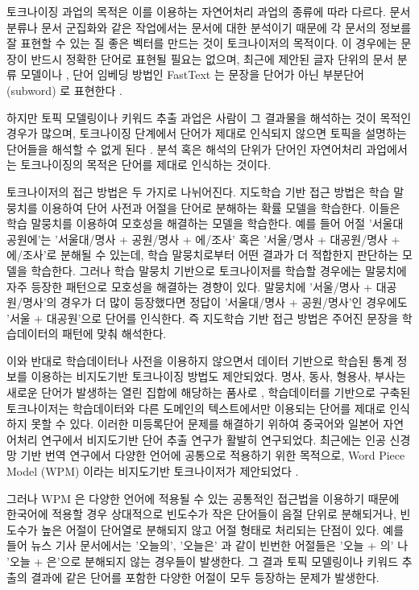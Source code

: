 \documentclass[oneside, ko,phd]{snuthesis_utf8_kor}
\begin{document}
토크나이징 과업의 목적은 이를 이용하는 자연어처리 과업의 종류에 따라 다르다.
문서 분류나 문서 군집화와 같은 작업에서는 문서에 대한 분석이기 때문에 각 문서의 정보를 잘 표현할 수 있는 질 좋은 벡터를 만드는 것이 토크나이저의 목적이다.
이 경우에는 문장이 반드시 정확한 단어로 표현될 필요는 없으며, 최근에 제안된 글자 단위의 문서 분류 모델이나 \cite{zhang2015character}, 단어 임베딩 방법인 FastText 는 문장을 단어가 아닌 부분단어 (subword) 로 표현한다 \cite{bojanowski2016enriching, joulin2016bag}.

하지만 토픽 모델링이나 키워드 추출 과업은 사람이 그 결과물을 해석하는 것이 목적인 경우가 많으며, 토크나이징 단계에서 단어가 제대로 인식되지 않으면 토픽을 설명하는 단어들을 해석할 수 없게 된다 \cite{hall2008studying}.
분석 혹은 해석의 단위가 단어인 자연어처리 과업에서는 토크나이징의 목적은 단어를 제대로 인식하는 것이다.

토크나이저의 접근 방법은 두 가지로 나뉘어진다.
지도학습 기반 접근 방법은 학습 말뭉치를 이용하여 단어 사전과 어절을 단어로 분해하는 확률 모델을 학습한다.
이들은 학습 말뭉치를 이용하여 모호성을 해결하는 모델을 학습한다.
예를 들어 어절 '서울대공원에'는 '서울대/명사 + 공원/명사 + 에/조사' 혹은 '서울/명사 + 대공원/명사 + 에/조사'로 분해될 수 있는데, 학습 말뭉치로부터 어떤 결과가 더 적합한지 판단하는 모델을 학습한다.
그러나 학습 말뭉치 기반으로 토크나이저를 학습할 경우에는 말뭉치에 자주 등장한 패턴으로 모호성을 해결하는 경향이 있다.
말뭉치에 '서울/명사 + 대공원/명사'의 경우가 더 많이 등장했다면 정답이 '서울대/명사 + 공원/명사'인 경우에도 '서울 + 대공원'으로 단어를 인식한다.
즉 지도학습 기반 접근 방법은 주어진 문장을 학습데이터의 패턴에 맞춰 해석한다.

이와 반대로 학습데이터나 사전을 이용하지 않으면서 데이터 기반으로 학습된 통계 정보를 이용하는 비지도기반 토크나이징 방법도 제안되었다.
명사, 동사, 형용사, 부사는 새로운 단어가 발생하는 열린 집합에 해당하는 품사로 \cite{jurafsky2000speech}, 학습데이터를 기반으로 구축된 토크나이저는 학습데이터와 다른 도메인의 텍스트에서만 이용되는 단어를 제대로 인식하지 못할 수 있다.
이러한 미등록단어 문제를 해결하기 위하여 중국어와 일본어 자연어처리 연구에서 비지도기반 단어 추출 연구가 활발히 연구되었다.
최근에는 인공 신경망 기반 번역 연구에서 다양한 언어에 공통으로 적용하기 위한 목적으로, Word Piece Model (WPM) 이라는 비지도기반 토크나이저가 제안되었다 \cite{sennrich2015neural}.

그러나 WPM 은 다양한 언어에 적용될 수 있는 공통적인 접근법을 이용하기 때문에 한국어에 적용할 경우 상대적으로 빈도수가 작은 단어들이 음절 단위로 분해되거나, 빈도수가 높은 어절이 단어열로 분해되지 않고 어절 형태로 처리되는 단점이 있다.
예를 들어 뉴스 기사 문서에서는 '오늘의', '오늘은' 과 같이 빈번한 어절들은 '오늘 + 의' 나 '오늘 + 은'으로 분해되지 않는 경우들이 발생한다.
그 결과 토픽 모델링이나 키워드 추출의 결과에 같은 단어를 포함한 다양한 어절이 모두 등장하는 문제가 발생한다.
\end{document}
